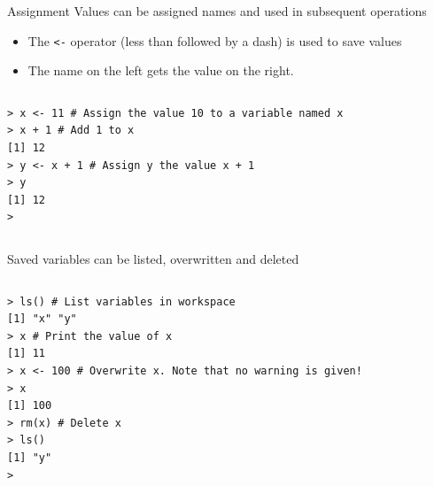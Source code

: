 \documentclass[table,smaller]{beamer}
\begin{document}
\begin{frame}[fragile,label=sec-3-1]{Assignment}
 Values can be assigned names and used in subsequent operations
\begin{itemize}
\item The \verb~<-~ operator (less than followed by a dash) is used to save values
\item The name on the left gets the value on the right.
\end{itemize}

\vspace{-.5em}
\begin{columns}
\begin{block}{}
\begin{verbatim}
> x <- 11 # Assign the value 10 to a variable named x
> x + 1 # Add 1 to x
[1] 12
> y <- x + 1 # Assign y the value x + 1
> y
[1] 12
>
\end{verbatim}
\end{block}
\end{columns}
\vspace{.5em}


Saved variables can be listed, overwritten and deleted
\vspace{-.5em}
\begin{columns}
\begin{block}{}
\begin{verbatim}
> ls() # List variables in workspace
[1] "x" "y"
> x # Print the value of x
[1] 11
> x <- 100 # Overwrite x. Note that no warning is given!
> x
[1] 100
> rm(x) # Delete x
> ls()
[1] "y"
>
\end{verbatim}
\end{block}
\end{columns}
\vspace{.5em}
\end{frame}
\end{document}

